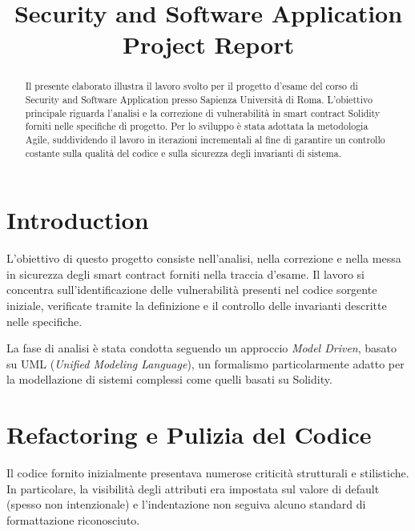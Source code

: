 \documentclass[conference]{IEEEtran}
\begin{document}
\title{Security and Software Application Project Report}

\author{
}

\maketitle

\begin{abstract}
	Il presente elaborato illustra il lavoro svolto per il progetto d'esame del corso di Security and Software Application presso Sapienza Università di Roma.
	L'obiettivo principale riguarda l'analisi e la correzione di vulnerabilità in smart contract Solidity forniti nelle specifiche di progetto.
	Per lo sviluppo è stata adottata la metodologia Agile, suddividendo il lavoro in iterazioni incrementali al fine di garantire un controllo costante sulla qualità del codice e sulla sicurezza degli invarianti di sistema.
\end{abstract}


\section{Introduction}

L'obiettivo di questo progetto consiste nell'analisi, nella correzione e nella messa in sicurezza degli smart contract forniti nella traccia d'esame.
Il lavoro si concentra sull'identificazione delle vulnerabilità presenti nel codice sorgente iniziale, verificate tramite la definizione e il controllo delle invarianti descritte nelle specifiche.

La fase di analisi è stata condotta seguendo un approccio \textit{Model Driven}, basato su UML (\textit{Unified Modeling Language}), un formalismo particolarmente adatto per la modellazione di sistemi complessi
come quelli basati su Solidity.

\section{Refactoring e Pulizia del Codice}

Il codice fornito inizialmente presentava numerose criticità strutturali e stilistiche.
In particolare, la visibilità degli attributi era impostata sul valore di default (spesso non intenzionale) e l'indentazione non seguiva alcuno standard di formattazione riconosciuto.
\end{document}

